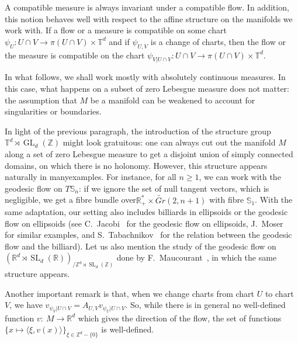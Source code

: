 \documentclass[10pt]{amsart}
\theoremstyle{definition}\newtheorem{defi}[theo]{Definition}\newtheorem{rema}[theo]{Remark}\newtheorem{exam}[theo]{Example}\newtheorem{exem}[theo]{Example}\newtheorem{nota}[theo]{Notation}
\DeclareMathOperator{\GL}{GL}
\DeclareMathOperator{\SL}{SL}
\newcommand{\Z}{\mathbb{Z}}
\newcommand{\R}{\mathbb{R}}
\newcommand{\Sbb}{\mathbb{S}}
\newcommand{\Tbb}{\mathbb{T}}
\begin{document}
A compatible measure is always invariant under a compatible flow. In addition, this notion behaves well with respect to the affine structure on the manifolds we work with. If a flow or a measure is compatible on some chart $\psi_U: U \cap V \to \pi (U \cap V) \times \Tbb^d$ and if $\psi_{U,V}$ is a change of charts, then the flow or the measure is compatible on the chart $\psi_{V|U \cap V}: U \cap V \to \pi (U \cap V) \times \Tbb^d$.


In what follows, we shall work mostly with absolutely continuous measures. In this case, what happens on a subset of zero Lebesgue measure does not matter: the assumption that $M$ be a manifold can be weakened to account for singularities or boundaries.


In light of the previous paragraph, the introduction of the structure group $\Tbb^d \rtimes \GL_d (\Z)$ might look gratuitous: one can always cut out the manifold $M$ along a set of zero Lebesgue measure to get a disjoint union of simply connected domains, on which there is no holonomy. However, this structure appears naturally in many\linebreak examples. For instance, for all $n \geq 1$, we can work with the geodesic flow on $T \Sbb_n$: if we ignore the set of null tangent vectors, which is negligible, we get a fibre bundle over\linebreak$\R_+^* \times \widetilde{Gr} (2, n+1)$ with fibre $\Sbb_1$. With the same adaptation, our setting also includes billiards in ellipsoids or the geodesic flow on ellipsoids (see C.~Jacobi~\cite{Jacobi:1866} for the geodesic flow on ellipsoids, J.~Moser~\cite{Moser:1978} for similar examples, and S.~Tabachnikov~\cite{Tabachnikov:2002} for the relation between the geodesic flow and the billiard). Let us also mention the study of the geodesic flow on $(\R^d \rtimes \SL_d (\R))_{/ \Z^d \rtimes\SL_d (\Z)}$ done by F.~Maucourant~\cite{Maucourant:2016}, in which the same structure appears.


Another important remark is that, when we change charts from chart $U$ to chart $V$, we have $v_{\psi_V | U \cap V} = A_{U, V} v_{\psi_U | U \cap V}$. So, while there is in general no well-defined function $v : \ M \to \R^d$ which gives the direction of the flow, the set of functions $\{x \mapsto \langle \xi, v(x) \rangle\}_{\xi \in \Z^d - \{0\}}$ is well-defined.

\end{document}
